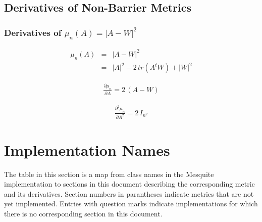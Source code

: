 \documentclass{report}
\begin{document}
\section{Derivatives of Non-Barrier Metrics}

\subsection{Derivatives of $\mu_n(A)=|A-W|^2$}

\begin{eqnarray}
\mu_n (A) & = & |A-W|^2 \\
          & = & |A|^2 - 2 \, tr(A^t W) + |W|^2 \nonumber
\end{eqnarray}

\begin{eqnarray}
\frac{\partial \mu_n}{\partial A} = 2 \, (A-W)
\end{eqnarray}
 
\begin{eqnarray}
\frac{\partial^2 \mu_n}{\partial A^2} = 2 \, I_{n^2}
\end{eqnarray}

\chapter{Implementation Names}

The table in this section is a map from class names in the Mesquite implementation to sections in this document describing the corresponding
metric and its derivatives.  Section numbers in parantheses indicate
metrics that are not yet implemented.  Entries with question marks indicate
implementations for which there is no corresponding section in this document.
\end{document}
